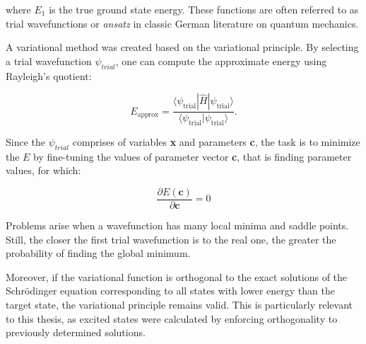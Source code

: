 \noindent where $E_1$ is the true ground state energy. These functions are often referred to as trial wavefunctions or \textit{ansatz} in classic German literature on quantum mechanics.

A variational method was created based on the variational principle. By selecting a trial wavefunction $\psi_{trial}$, one can compute the approximate energy using Rayleigh's quotient:

\begin{equation} E_{\text{approx}} = \frac{\langle \psi_{\text{trial}} | \hat{H} | \psi_{\text{trial}} \rangle}{\langle \psi_{\text{trial}} | \psi_{\text{trial}} \rangle}. \end{equation}

Since the $\psi_{trial}$ comprises of variables \textbf{x} and parameters \textbf{c}, the task is to minimize the $E$  by fine-tuning the values of parameter vector \textbf{c}, that is finding parameter values, for which\cite{IzaacWang2018ComputationalQM}:

\begin{equation} 
\frac{\partial E(\textbf{c})}{\partial \textbf{c}} = 0
\end{equation}

Problems arise when a wavefunction has many local minima and saddle points. Still, the closer the first trial wavefunction is to the real one, the greater the probability of finding the global minimum.

Moreover, if the variational function is orthogonal to the exact solutions of the Schrödinger equation corresponding to all states with lower energy than the target state, the variational principle remains valid.\cite{ideas_of_qc} This is particularly relevant to this thesis, as excited states were calculated by enforcing orthogonality to previously determined solutions.


